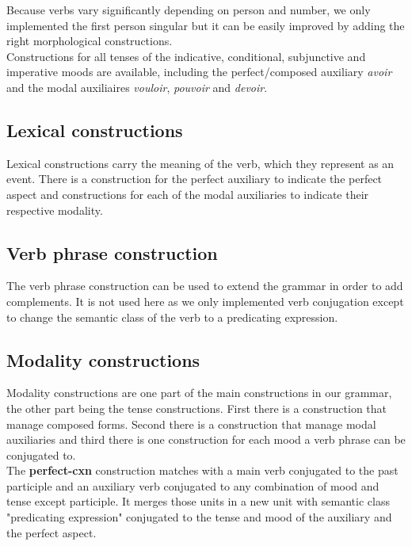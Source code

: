 \documentclass[a4paper,10pt]{article}
\begin{document}
Because verbs vary significantly depending on person and number, we only implemented the first person singular but it can be easily improved by adding the right morphological constructions. \\

Constructions for all tenses of the indicative, conditional, subjunctive and imperative moods are available, including the perfect/composed auxiliary \textit{avoir} and the modal auxiliaires \textit{vouloir}, \textit{pouvoir} and \textit{devoir}.

\subsection{Lexical constructions}

Lexical constructions carry the meaning of the verb, which they represent as an event. There is a construction for the perfect auxiliary to indicate the perfect aspect and constructions for each of the modal auxiliaries to indicate their respective modality. \\

\subsection{Verb phrase construction}

The verb phrase construction can be used to extend the grammar in order to add complements. It is not used here as we only implemented verb conjugation except to change the semantic class of the verb to a predicating expression.

\subsection{Modality constructions}

Modality constructions are one part of the main constructions in our grammar, the other part being the tense constructions. First there is a construction that manage composed forms. Second there is a construction that manage modal auxiliaries and third there is one construction for each mood a verb phrase can be conjugated to. \\

The \textbf{perfect-cxn} construction matches with a main verb conjugated to the past participle and an auxiliary verb conjugated to any combination of mood and tense except participle. It merges those units in a new unit with semantic class "predicating expression" conjugated to the tense and mood of the auxiliary and the perfect aspect. \\
\end{document}
